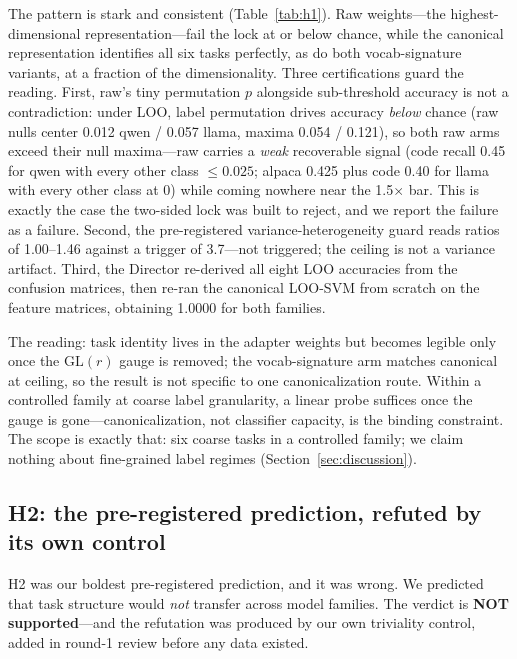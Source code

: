 \documentclass[10pt]{article}
\begin{document}
The pattern is stark and consistent (Table~\ref{tab:h1}). Raw weights---the
highest-dimensional representation---fail the lock at or below chance,
while the canonical representation identifies all six tasks perfectly, as
do both vocab-signature variants, at a fraction of the dimensionality.
Three certifications guard the reading. First, raw's tiny permutation $p$
alongside sub-threshold accuracy is not a contradiction: under LOO, label
permutation drives accuracy \emph{below} chance (raw nulls center 0.012
qwen / 0.057 llama, maxima 0.054 / 0.121), so both raw arms exceed their
null maxima---raw carries a \emph{weak} recoverable signal (code recall
0.45 for qwen with every other class $\le 0.025$; alpaca 0.425 plus code
0.40 for llama with every other class at 0) while coming nowhere near the
1.5$\times$ bar. This is exactly the case the two-sided lock was built to
reject, and we report the failure as a failure. Second, the pre-registered
variance-heterogeneity guard reads ratios of 1.00--1.46 against a trigger
of 3.7---not triggered; the ceiling is not a variance artifact. Third, the
Director re-derived all eight LOO accuracies from the confusion matrices,
then re-ran the canonical LOO-SVM from scratch on the feature matrices,
obtaining 1.0000 for both families.

The reading: task identity lives in the adapter weights but becomes
legible only once the $\mathrm{GL}(r)$ gauge is removed; the
vocab-signature arm matches canonical at ceiling, so the result is not
specific to one canonicalization route. Within a controlled family at
coarse label granularity, a linear probe suffices once the gauge is
gone---canonicalization, not classifier capacity, is the binding
constraint. The scope is exactly that: six coarse tasks in a controlled
family; we claim nothing about fine-grained label regimes
(Section~\ref{sec:discussion}).

\subsection{H2: the pre-registered prediction, refuted by its own control}
\label{sec:h2}

H2 was our boldest pre-registered prediction, and it was wrong. We
predicted that task structure would \emph{not} transfer across model
families. The verdict is \textbf{NOT supported}---and the refutation was
produced by our own triviality control, added in round-1 review before
any data existed.
\end{document}
